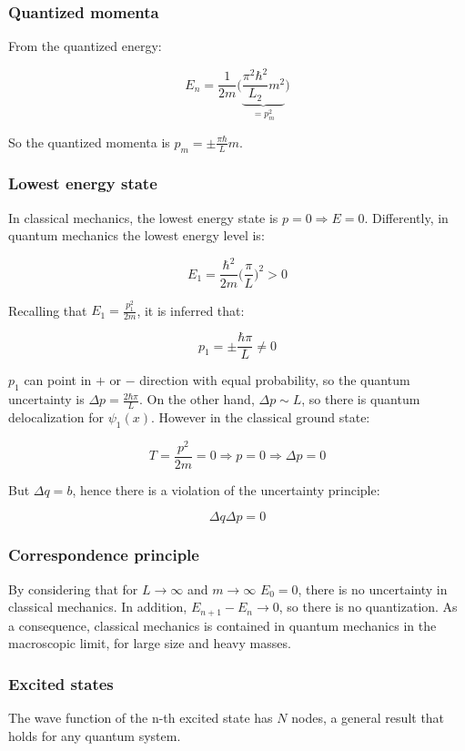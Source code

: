     \subsubsection{Quantized momenta}
    From the quantized energy:

    $$E_n = \frac{1}{2m}\biggl(\underbrace{\frac{\pi^2\hbar^2}{L_2}m^2}_{=p_m^2}\biggr)$$

    So the quantized momenta is $p_m = \pm \frac{\pi\hbar}{L}m$.

    \subsubsection{Lowest energy state}
    In classical mechanics, the lowest energy state is $p = 0\Rightarrow E = 0$.
    Differently, in quantum mechanics the lowest energy level is:

    $$E_1 = \frac{\hbar^2}{2m}\biggl(\frac{\pi}{L}\biggr)^2 > 0$$

    Recalling that $E_1 = \frac{p_1^2}{2m}$, it is inferred that:

    $$p_1 = \pm \frac{\hbar\pi}{L}\neq 0$$

    $p_1$ can point in $+$ or $-$ direction with equal probability, so the quantum uncertainty is $\Delta p =\frac{2\hbar\pi}{L}$.
    On the other hand, $\Delta p \sim L$, so there is quantum delocalization for $\psi_1(x)$.
    However in the classical ground state:

    $$T = \frac{p^2}{2m} = 0\Rightarrow p = 0\Rightarrow \Delta p = 0$$

    But $\Delta q = b$, hence there is a violation of the uncertainty principle:

    $$\Delta q\Delta p = 0$$

    \subsubsection{Correspondence principle}
    By considering that for $L\rightarrow\infty$ and $m\rightarrow\infty$ $E_0 = 0$, there is no uncertainty in classical mechanics. In addition, $E_{n+1}-E_n \rightarrow 0$, so there is no quantization.
    As a consequence, classical mechanics is contained in quantum mechanics in the macroscopic limit, for large size and heavy masses.

    \subsubsection{Excited states}
    The wave function of the n-th excited state has $N$ nodes, a general result that holds for any quantum system.

